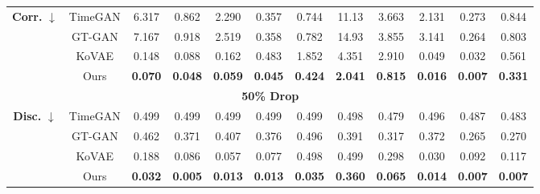 \documentclass{article}
\theoremstyle{plain}
\theoremstyle{definition}
\theoremstyle{remark}
\begin{document}
\begin{table}[!t]
{\begin{tabular}{cc|cccccccccc}
    \multirow{4}{*}{\textbf{Corr.} $\downarrow$} 
      & TimeGAN 
         & 6.317 
         & 0.862 
         & 2.290 
         & 0.357 
         & 0.744 
         & 11.13 
         & 3.663 
         & 2.131 
         & 0.273 
         & 0.844 \\
      & GT-GAN  
         & 7.167 
         & 0.918 
         & 2.519 
         & 0.358 
         & 0.782 
         & 14.93 
         & 3.855 
         & 3.141 
         & 0.264 
         & 0.803 \\
      & KoVAE   
         & 0.148 
         & 0.088 
         & 0.162 
         & 0.483 
         & 1.852 
         & 4.351 
         & 2.910 
         & 0.049 
         & 0.032 
         & 0.561 \\
      & Ours    
         & \cellcolor{blue!10}\textbf{0.070}
         & \cellcolor{blue!10}\textbf{0.048}
         & \cellcolor{blue!10}\textbf{0.059}
         & \cellcolor{blue!10}\textbf{0.045}
         & \cellcolor{blue!10}\textbf{0.424}
         & \cellcolor{blue!10}\textbf{2.041}
         & \cellcolor{blue!10}\textbf{0.815}
         & \cellcolor{blue!10}\textbf{0.016}
         & \cellcolor{blue!10}\textbf{0.007}
         & \cellcolor{blue!10}\textbf{0.331} \\
    \midrule
    
    \multicolumn{12}{c}{\textbf{50\% Drop}} \\[3pt]
    \midrule
    \multirow{4}{*}{\textbf{Disc.} $\downarrow$} 
      & TimeGAN 
         & 0.499 
         & 0.499 
         & 0.499 
         & 0.499 
         & 0.499 
         & 0.498 
         & 0.479 
         & 0.496 
         & 0.487 
         & 0.483 \\
      & GT-GAN  
         & 0.462 
         & 0.371 
         & 0.407 
         & 0.376 
         & 0.496 
         & 0.391 
         & 0.317 
         & 0.372 
         & 0.265 
         & 0.270 \\
      & KoVAE   
         & 0.188 
         & 0.086 
         & 0.057 
         & 0.077 
         & 0.498 
         & 0.499 
         & 0.298 
         & 0.030 
         & 0.092 
         & 0.117 \\
      & Ours    
         & \cellcolor{blue!10}\textbf{0.032}
         & \cellcolor{blue!10}\textbf{0.005}
         & \cellcolor{blue!10}\textbf{0.013}
         & \cellcolor{blue!10}\textbf{0.013}
         & \cellcolor{blue!10}\textbf{0.035}
         & \cellcolor{blue!10}\textbf{0.360}
         & \cellcolor{blue!10}\textbf{0.065}
         & \cellcolor{blue!10}\textbf{0.014}
         & \cellcolor{blue!10}\textbf{0.007}
         & \cellcolor{blue!10}\textbf{0.007} \\
    \midrule
    

\end{tabular}}
\end{table}
\end{document}
